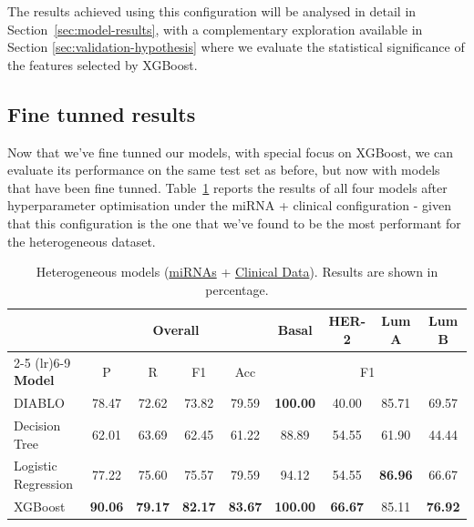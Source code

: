 The results achieved using this configuration will be analysed in detail in 
Section~\ref{sec:model-results}, with a complementary exploration available in Section \ref{sec:validation-hypothesis}
 where we evaluate the statistical significance of the features selected by XGBoost.

\subsection{Fine tunned results}
\label{sec:finetuned-results}

Now that we've fine tunned our models, with special focus on XGBoost, 
we can evaluate its performance on the same test set as before, but now with models 
that have been fine tunned. Table~\ref{tab:heterogeneous} reports the results of all four models 
after hyperparameter optimisation under the miRNA + clinical 
configuration - given that this configuration is the one that we've found to be the most performant 
for the heterogeneous dataset.

\begin{table}[!ht]
    \centering
    \caption{Heterogeneous models (\underline{miRNAs} + \underline{Clinical Data}). Results are shown in percentage.}
    \label{tab:heterogeneous}
    \begin{tabular}{lcccccccc}
        \toprule
        & \multicolumn{4}{c}{\textbf{Overall}} & \multicolumn{1}{c}{\textbf{Basal}}  & \multicolumn{1}{c}{\textbf{HER-2}} & \multicolumn{1}{c}{\textbf{Lum A}} & \multicolumn{1}{c}{\textbf{Lum B}}\\
        \cmidrule(lr){2-5} \cmidrule(lr){6-9} 
        \textbf{Model} & P  & R & F1  & Acc  & \multicolumn{4}{c}{F1}  \\
        \midrule
        DIABLO                  & 78.47 & 72.62 & 73.82  & 79.59 & \textbf{100.00} & 40.00 & 85.71  & 69.57 \\
        \midrule
        Decision Tree           & 62.01 & 63.69 & 62.45 & 61.22 & 88.89 & 54.55 & 61.90 & 44.44 \\
        Logistic Regression           & 77.22 & 75.60 &  75.57 & 79.59 & 94.12 & 54.55 & \textbf{86.96} & 66.67 \\
        XGBoost           & \textbf{90.06} & \textbf{79.17} & \textbf{82.17} & \textbf{83.67} & \textbf{100.00} & \textbf{66.67} & 85.11 & \textbf{76.92}  \\
        \bottomrule
    \end{tabular}
\end{table}



